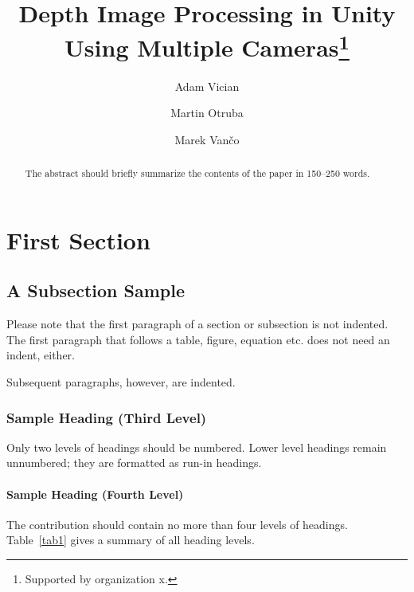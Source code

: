 \documentclass[runningheads]{llncs}
\begin{document}
%
\title{Depth Image Processing in Unity Using Multiple Cameras\thanks{Supported by organization x.}}
%
%
\author{Adam Vician \and
Martin Otruba \and
Marek Vančo}
%
%
%
\maketitle              %
%
\begin{abstract}
The abstract should briefly summarize the contents of the paper in
150--250 words.

\end{abstract}
%
%
%
\section{First Section}
\subsection{A Subsection Sample}
Please note that the first paragraph of a section or subsection is
not indented. The first paragraph that follows a table, figure,
equation etc. does not need an indent, either.

Subsequent paragraphs, however, are indented.

\subsubsection{Sample Heading (Third Level)} Only two levels of
headings should be numbered. Lower level headings remain unnumbered;
they are formatted as run-in headings.

\paragraph{Sample Heading (Fourth Level)}
The contribution should contain no more than four levels of
headings. Table~\ref{tab1} gives a summary of all heading levels.
\end{document}

